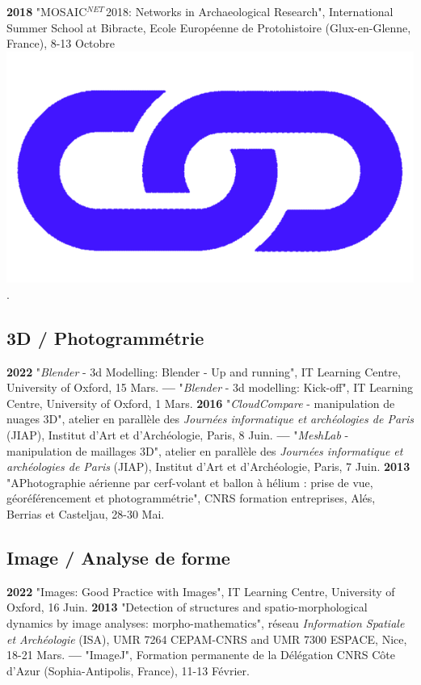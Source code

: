 \documentclass{article}
\begin{document}
\textbf{2018 }"MOSAIC${}^{NET\ }$2018: Networks in Archaeological Research", International Summer School at Bibracte, Ecole Europ\'{e}enne de Protohistoire (Glux-en-Glenne, France), 8-13 Octobre \href{https://www.ufg.uni-kiel.de/en/news_expired/events-ufg/conferences-exhibitions/mosaic-2018}{\includegraphics[scale=0.02]{link_darkblue.png}}.

\subsection*{3D / Photogrammétrie}

\textbf{2022 }"\textit{Blender} - 3d Modelling: Blender - Up and running", IT Learning Centre, University of Oxford, 15 Mars.
\smallbreak
\textbf{--- }"\textit{Blender} - 3d modelling: Kick-off", IT Learning Centre, University of Oxford, 1 Mars.
\smallbreak
\textbf{2016 }"\textit{CloudCompare} - manipulation de nuages 3D", atelier en parallèle des \textit{Journ\'{e}es informatique et arch\'{e}ologies de Paris} (JIAP), Institut d'Art et d'Arch\'{e}ologie, Paris, 8 Juin.
\smallbreak
\textbf{--- }"\textit{MeshLab }- manipulation de maillages 3D", atelier en parallèle des \textit{Journ\'{e}es informatique et arch\'{e}ologies de Paris} (JIAP), Institut d'Art et d'Arch\'{e}ologie, Paris, 7 Juin.
\smallbreak
\textbf{2013 }"APhotographie aérienne par cerf-volant et ballon à hélium : prise de vue, géoréférencement et photogrammétrie", CNRS formation entreprises, Al\'{e}s, Berrias et Casteljau, 28-30 Mai.

\subsection*{Image / Analyse de forme}

\textbf{2022 }"Images: Good Practice with Images", IT Learning Centre, University of Oxford, 16 Juin.
\smallbreak
\textbf{2013 }"Detection of structures and spatio-morphological dynamics by image analyses: morpho-mathematics", réseau \textit{Information Spatiale et Arch\'{e}ologie} (ISA), UMR 7264 CEPAM-CNRS and UMR 7300 ESPACE, Nice, 18-21 Mars.
\smallbreak
\textbf{--- }"ImageJ", Formation permanente de la Délégation CNRS Côte d'Azur (Sophia-Antipolis, France), 11-13 Février.
\end{document}
